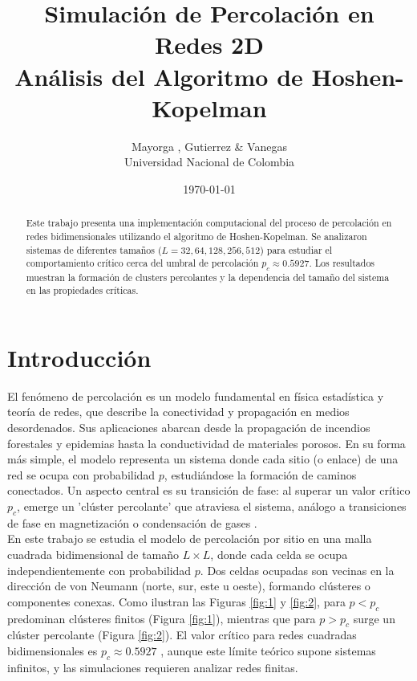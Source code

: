 \documentclass[12pt,a4paper]{article}
\title{Simulación de Percolación en Redes 2D\\
       Análisis del Algoritmo de Hoshen-Kopelman}
\author{Mayorga , Gutierrez \& Vanegas\\
        Universidad Nacional de Colombia}
\date{\today}
\begin{document}
\maketitle

\begin{abstract}
Este trabajo presenta una implementación computacional del proceso de percolación en redes bidimensionales utilizando el algoritmo de Hoshen-Kopelman. Se analizaron sistemas de diferentes tamaños ($L = 32, 64, 128, 256, 512$) para estudiar el comportamiento crítico cerca del umbral de percolación $p_c \approx 0.5927$. Los resultados muestran la formación de clusters percolantes y la dependencia del tamaño del sistema en las propiedades críticas.
\end{abstract}

\section{Introducción}

El fenómeno de percolación es un modelo fundamental en física estadística y teoría de redes, que describe la conectividad y propagación en medios desordenados. Sus aplicaciones abarcan desde la propagación de incendios forestales y epidemias hasta la conductividad de materiales porosos. En su forma más simple, el modelo representa un sistema donde cada sitio (o enlace) de una red se ocupa con probabilidad \( p \), estudiándose la formación de caminos conectados. Un aspecto central es su transición de fase: al superar un valor crítico \( p_c \), emerge un 'clúster percolante' que atraviesa el sistema, análogo a transiciones de fase en magnetización o condensación de gases \cite{CantabranaBarrio2018, PERCentralPercolation}.
\\

En este trabajo se estudia el modelo de percolación por sitio en una malla cuadrada bidimensional de tamaño \( L \times L \), donde cada celda se ocupa independientemente con probabilidad \( p \). Dos celdas ocupadas son vecinas en la dirección de von Neumann (norte, sur, este u oeste), formando clústeres o componentes conexas. Como ilustran las Figuras \ref{fig:1} y \ref{fig:2}, para \( p < p_c \) predominan clústeres finitos (Figura \ref{fig:1}), mientras que para \( p > p_c \) surge un clúster percolante (Figura \ref{fig:2}). El valor crítico para redes cuadradas bidimensionales es \( p_c \approx 0.5927 \) \cite{PERCentralPercolation}, aunque este límite teórico supone sistemas infinitos, y las simulaciones requieren analizar redes finitas.
\end{document}
